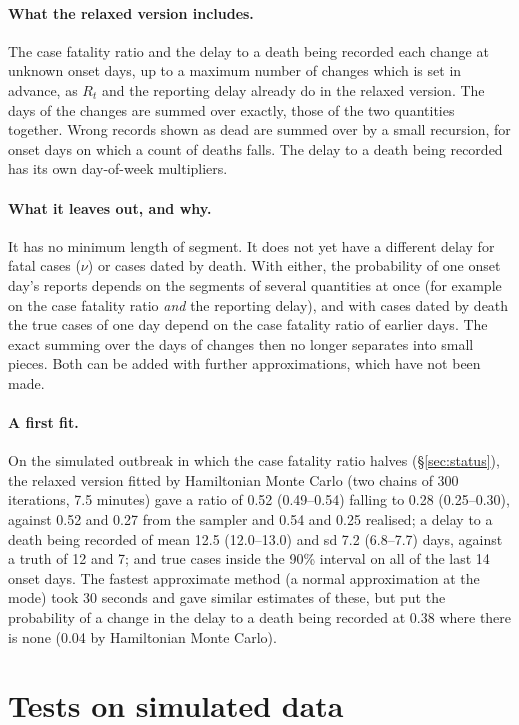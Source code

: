 \documentclass[11pt,a4paper]{article}
\begin{document}
\paragraph{What the relaxed version includes.} The case fatality ratio and
the delay to a death being recorded each change at unknown onset days, up
to a maximum number of changes which is set in advance, as $R_t$ and the
reporting delay already do in the relaxed version. The days of the changes
are summed over exactly, those of the two quantities together. Wrong
records shown as dead are summed over by a small recursion, for onset days
on which a count of deaths falls. The delay to a death being recorded has
its own day-of-week multipliers.

\paragraph{What it leaves out, and why.} It has no minimum length of
segment. It does not yet have a different delay for fatal cases ($\nu$) or
cases dated by death. With either, the probability of one onset day's
reports depends on the segments of several quantities at once (for example
on the case fatality ratio \emph{and} the reporting delay), and with cases
dated by death the true cases of one day depend on the case fatality ratio
of earlier days. The exact summing over the days of changes then no longer
separates into small pieces. Both can be added with further approximations,
which have not been made.

\paragraph{A first fit.} On the simulated outbreak in which the case
fatality ratio halves (\S\ref{sec:status}), the relaxed version fitted by
Hamiltonian Monte Carlo (two chains of 300 iterations, 7.5 minutes) gave a
ratio of 0.52 (0.49--0.54) falling to 0.28 (0.25--0.30), against 0.52 and
0.27 from the sampler and 0.54 and 0.25 realised; a delay to a death being
recorded of mean 12.5 (12.0--13.0) and sd 7.2 (6.8--7.7) days, against a
truth of 12 and 7; and true cases inside the 90\% interval on all of the
last 14 onset days. The fastest approximate method (a normal approximation
at the mode) took 30 seconds and gave similar estimates of these, but put
the probability of a change in the delay to a death being recorded at 0.38
where there is none (0.04 by Hamiltonian Monte Carlo).

\section{Tests on simulated data}\label{sec:tests}
\end{document}
